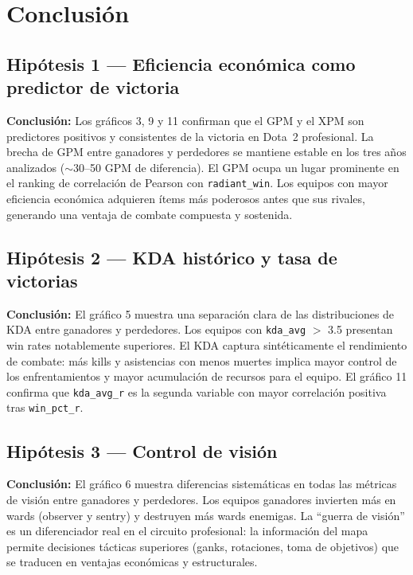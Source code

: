 \documentclass[12pt,a4paper]{article}
\begin{document}
\section{Conclusi\'on}

\subsection*{Hip\'otesis 1 --- Eficiencia econ\'omica como predictor de victoria}

\textbf{Conclusi\'on:} Los gr\'aficos 3, 9 y 11 confirman que el GPM y el XPM son
predictores positivos y consistentes de la victoria en Dota~2 profesional. La
brecha de GPM entre ganadores y perdedores se mantiene estable en los tres a\~nos
analizados ($\sim$30--50 GPM de diferencia). El GPM ocupa un lugar prominente en
el ranking de correlaci\'on de Pearson con \texttt{radiant\_win}. Los equipos con
mayor eficiencia econ\'omica adquieren \'items m\'as poderosos antes que sus
rivales, generando una ventaja de combate compuesta y sostenida.

\subsection*{Hip\'otesis 2 --- KDA hist\'orico y tasa de victorias}

\textbf{Conclusi\'on:} El gr\'afico 5 muestra una separaci\'on clara de las
distribuciones de KDA entre ganadores y perdedores. Los equipos con
\texttt{kda\_avg} $>$ 3.5 presentan win rates notablemente superiores. El KDA
captura sint\'eticamente el rendimiento de combate: m\'as kills y asistencias con
menos muertes implica mayor control de los enfrentamientos y mayor acumulaci\'on
de recursos para el equipo. El gr\'afico 11 confirma que \texttt{kda\_avg\_r}
es la segunda variable con mayor correlaci\'on positiva tras \texttt{win\_pct\_r}.

\subsection*{Hip\'otesis 3 --- Control de visi\'on}

\textbf{Conclusi\'on:} El gr\'afico 6 muestra diferencias sistem\'aticas en todas
las m\'etricas de visi\'on entre ganadores y perdedores. Los equipos ganadores
invierten m\'as en wards (observer y sentry) y destruyen m\'as wards enemigas. La
``guerra de visi\'on'' es un diferenciador real en el circuito profesional: la
informaci\'on del mapa permite decisiones t\'acticas superiores (ganks, rotaciones,
toma de objetivos) que se traducen en ventajas econ\'omicas y estructurales.
\end{document}
